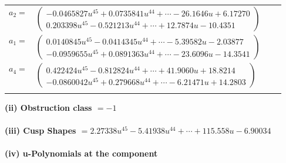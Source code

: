 \documentclass[1p]{elsarticle_modified}
\theoremstyle{definition}
\begin{document}
\begin{tabular}{m{7pt} m{180pt} m{7pt} m{180pt} }
\flushright $a_{2}=$&$\begin{pmatrix}-0.0465827 u^{45}+0.0735841 u^{44}+\cdots-26.1646 u+6.17270\\0.203398 u^{45}-0.521213 u^{44}+\cdots+12.7874 u-10.4351\end{pmatrix}$ \\
\flushright $a_{1}=$&$\begin{pmatrix}0.0140845 u^{45}-0.0414345 u^{44}+\cdots-5.39582 u-2.03877\\-0.0959655 u^{45}+0.0891363 u^{44}+\cdots-23.6096 u-14.3541\end{pmatrix}$ \\
\flushright $a_{4}=$&$\begin{pmatrix}0.422424 u^{45}-0.812824 u^{44}+\cdots+41.9060 u+18.8214\\-0.0860042 u^{45}+0.279668 u^{44}+\cdots-6.21471 u+14.2803\end{pmatrix}$\\&\end{tabular}
\flushleft \textbf{(ii) Obstruction class $= -1$}\\~\\
\flushleft \textbf{(iii) Cusp Shapes $= 2.27338 u^{45}-5.41938 u^{44}+\cdots+115.558 u-6.90034$}\\~\\
\newpage\renewcommand{\arraystretch}{1}
\flushleft \textbf{(iv) u-Polynomials at the component}\newline \\
\end{document}
